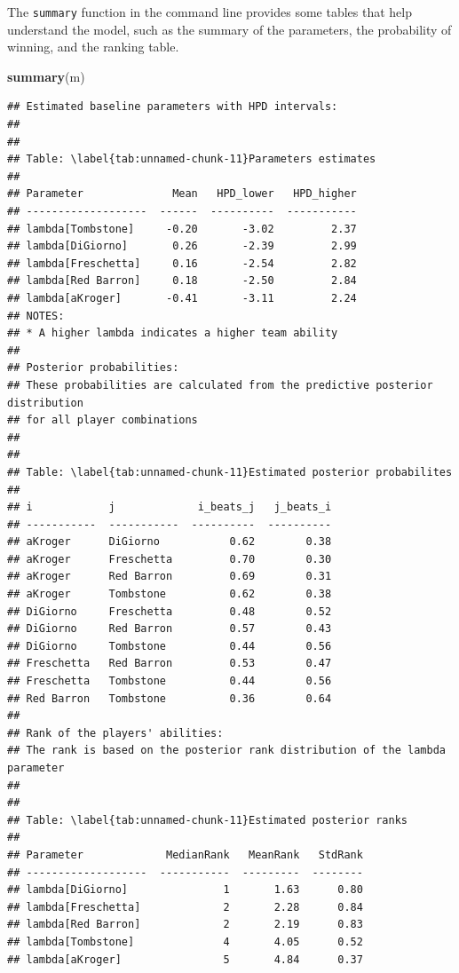 \documentclass[
]{book}
\newenvironment{Shaded}{\begin{snugshade}}{\end{snugshade}}
\newcommand{\KeywordTok}[1]{\textcolor[rgb]{0.13,0.29,0.53}{\textbf{#1}}}
\newcommand{\NormalTok}[1]{#1}
\begin{document}
The \texttt{summary} function in the command line provides some tables that help understand the model, such as the summary of the parameters, the probability of winning, and the ranking table.

\begin{Shaded}
\begin{Highlighting}[]
\KeywordTok{summary}\NormalTok{(m)}
\end{Highlighting}
\end{Shaded}

\begin{verbatim}
## Estimated baseline parameters with HPD intervals:
## 
## 
## Table: \label{tab:unnamed-chunk-11}Parameters estimates
## 
## Parameter              Mean   HPD_lower   HPD_higher
## -------------------  ------  ----------  -----------
## lambda[Tombstone]     -0.20       -3.02         2.37
## lambda[DiGiorno]       0.26       -2.39         2.99
## lambda[Freschetta]     0.16       -2.54         2.82
## lambda[Red Barron]     0.18       -2.50         2.84
## lambda[aKroger]       -0.41       -3.11         2.24
## NOTES:
## * A higher lambda indicates a higher team ability
## 
## Posterior probabilities:
## These probabilities are calculated from the predictive posterior distribution
## for all player combinations
## 
## 
## Table: \label{tab:unnamed-chunk-11}Estimated posterior probabilites
## 
## i            j             i_beats_j   j_beats_i
## -----------  -----------  ----------  ----------
## aKroger      DiGiorno           0.62        0.38
## aKroger      Freschetta         0.70        0.30
## aKroger      Red Barron         0.69        0.31
## aKroger      Tombstone          0.62        0.38
## DiGiorno     Freschetta         0.48        0.52
## DiGiorno     Red Barron         0.57        0.43
## DiGiorno     Tombstone          0.44        0.56
## Freschetta   Red Barron         0.53        0.47
## Freschetta   Tombstone          0.44        0.56
## Red Barron   Tombstone          0.36        0.64
## 
## Rank of the players' abilities:
## The rank is based on the posterior rank distribution of the lambda parameter
## 
## 
## Table: \label{tab:unnamed-chunk-11}Estimated posterior ranks
## 
## Parameter             MedianRank   MeanRank   StdRank
## -------------------  -----------  ---------  --------
## lambda[DiGiorno]               1       1.63      0.80
## lambda[Freschetta]             2       2.28      0.84
## lambda[Red Barron]             2       2.19      0.83
## lambda[Tombstone]              4       4.05      0.52
## lambda[aKroger]                5       4.84      0.37
\end{verbatim}
\end{document}
